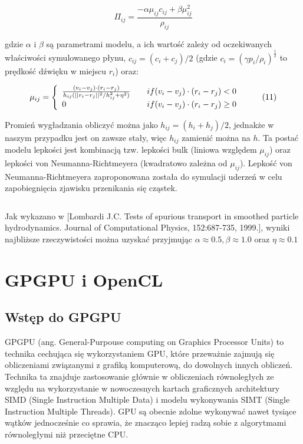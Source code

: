 \documentclass[polish, 12pt]{aghthesis}
\begin{document}
			\[{\Pi}_{ij} = \frac{-\alpha \mu_{ij} c_{ij} + \beta\mu_{ij}^2}{\rho_{ij}} \label{eq:viscosity_term} \tag{10}\]
	
			gdzie $\alpha$ i $\beta$ są parametrami modelu, a ich wartość zależy od oczekiwanych właściwości symulowanego płynu, $c_{ij} = (c_i + c_j) / 2$ (gdzie $c_i = (\gamma p_i / \rho_i)^\frac{1}{2}$ to prędkość dźwięku w miejscu $r_i$) oraz:
			
			\[{\mu}_{ij} = \left\{
				\begin{array}{l l}
					\frac{(v_i - v_j)\cdot(r_i - r_j)}{h_{ij}(||r_i - r_j||^2 / h_{ij}^2 + \eta^2)} & \quad if{(v_i - v_j)\cdot(r_i - r_j) < 0}  \\ 0 & \quad if{(v_i - v_j)\cdot(r_i - r_j) \geq 0} 
				\end{array} \right.\ \label{eq:mu_factor} \tag{11}\]
				
			Promień wygładzania obliczyć można jako $h_{ij} = (h_i + h_j)/2$, jednakże w naszym przypadku jest on zawsze stały, więc $h_{ij}$ zamienić można na $h$. Ta postać modelu lepkości jest kombinacją tzw. lepkości bulk (liniowa względem $\mu_{ij}$) oraz lepkości von Neumanna-Richtmeyera (kwadratowo zależna od $\mu_{ij}$). Lepkość von Neumanna-Richtmeyera zaproponowana została do symulacji uderzeń w celu zapobiegnięcia zjawisku przenikania się cząstek. 
			
			$\,$		

			Jak wykazano w [Lombardi J.C. Tests of spurious transport in smoothed particle hydrodynamics. Journal of Computational Physics, 152:687-735, 1999.], wyniki najbliższe rzeczywistości można uzyskać przyjmując $\alpha \approx 0.5, \beta \approx 1.0$ oraz $\eta \approx 0.1$
	
	\section{GPGPU i OpenCL}
		
		\subsection{Wstęp do GPGPU}
			GPGPU (ang. General-Purpouse computing on Graphics Processor Units) to technika cechująca się wykorzystaniem GPU, które przeważnie zajmują się obliczeniami związanymi z grafiką komputerową, do dowolnych innych obliczeń. Technika ta znajduje zastosowanie głównie w obliczeniach równoległych ze względu na wykorzystanie w nowoczesnych kartach graficznych architektury SIMD (Single Instruction Multiple Data) i modelu wykonywania SIMT (Single Instruction Multiple Threads). GPU są obecnie zdolne wykonywać nawet tysiące wątków jednocześnie co sprawia, że znacząco lepiej radzą sobie z algorytmami równoległymi niż przeciętne CPU. 
			
\end{document}
